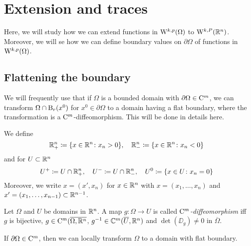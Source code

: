 \chapter{Extension and traces}
\label{chap:extAndTrace}

Here, we will study how we can extend functions in $\mathrm{W}^{k,p}(\Omega)$ to $\mathrm{W}^{k,P}(\mathbb{R}^n)$.
Moreover, we will se how we can define boundary values on $\partial\Omega$ of functions in $\mathrm{W}^{k,p}(\Omega)$.

\section{Flattening the boundary}

We will frequently use that if $\Omega$ is a bounded domain with $\partial\Omega \in \mathrm{C}^m$, we can transform $\Omega \cap \mathrm{B}_r(x^0)$ for $x^0 \in \partial\Omega$ to a domain having a flat boundary, where the transformation is a $\mathrm{C}^m$-diffeomorphism.
This will be done in details here.

\begin{ntion}
  We define 
  $$
  \mathbb{R}^n_+ \coloneqq \{x \in \mathbb{R}^n \colon x_n > 0 \}, \quad \mathbb{R}^n_-\coloneqq \{x \in \mathbb{R}^n \colon x_n < 0\}
  $$
  and for $U \subset \mathbb{R}^n$
  $$
  U^+ \coloneqq U \cap \mathbb{R}^n_+, \quad U^- \coloneqq U \cap \mathbb{R}^n_-, \quad U^0 \coloneqq \{x \in U \colon x_n = 0\}
  $$
  Moreover, we write $x = (x', x_n)$ for $x \in \mathbb{R}^n$ with $x = (x_1,\dots,x_n)$ and $x' =(x_1, \dots, x_{n - 1}) \subset \mathbb{R}^{n - 1}$.
\end{ntion}

\begin{defn}
  \label{defn:CmDiffeo}
  Let $\Omega$ and $U$ be domains in $\mathbb{R}^n$.
  A map $g \colon \Omega \to U$ is called \emph{$\mathrm{C}^m$-diffeomorphism} iff $g$ is bijective, $g \in \mathrm{C}^m(\overline{\Omega,\mathbb{R}^n}$, $g^{-1} \in \mathbb{C}^m(\overline U, \mathbb{R}^n)$ and $\det(\DD_g) \neq 0$ in $\overline \Omega$.
\end{defn}

If $\partial \Omega \in \mathrm{C}^m$, then we can locally transform $\Omega$ to a domain with flat boundary.

